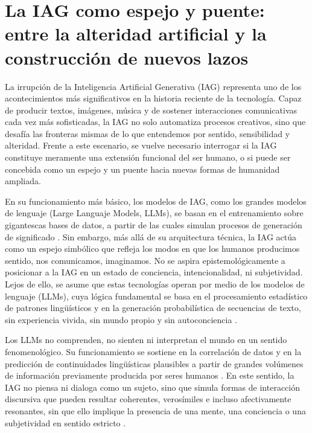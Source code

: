 \documentclass[spanish]{textolivre}
\begin{document}


\section{La IAG como espejo y puente: entre la alteridad artificial y la construcción de nuevos lazos}\label{sec-fmt-manuscrito}
La irrupción de la Inteligencia Artificial Generativa (IAG) representa uno de los acontecimientos más significativos en la historia reciente de la tecnología. Capaz de producir textos, imágenes, música y de sostener interacciones comunicativas cada vez más sofisticadas, la IAG no solo automatiza procesos creativos, sino que desafía las fronteras mismas de lo que entendemos por sentido, sensibilidad y alteridad. Frente a este escenario, se vuelve necesario interrogar si la IAG constituye meramente una extensión funcional del ser humano, o si puede ser concebida como un espejo y un puente hacia nuevas formas de humanidad ampliada.

En su funcionamiento más básico, los modelos de IAG, como los grandes modelos de lenguaje (Large Languaje Models, LLMs), se basan en el entrenamiento sobre gigantescas bases de datos, a partir de las cuales simulan procesos de generación de significado \cite{amezcua2023}. Sin embargo, más allá de su arquitectura técnica, la IAG actúa como un espejo simbólico que refleja los modos en que los humanos producimos sentido, nos comunicamos, imaginamos. No se aspira epistemológicamente a posicionar a la IAG en un estado de conciencia, intencionalidad, ni subjetividad. Lejos de ello, se asume que estas tecnologías operan por medio de los modelos de lenguaje (LLMs), cuya lógica fundamental se basa en el procesamiento estadístico de patrones lingüísticos y en la generación probabilística de secuencias de texto, sin experiencia vivida, sin mundo propio y sin autoconciencia \cite{bender2021,floridi2019}.

Los LLMs no comprenden, no sienten ni interpretan el mundo en un sentido fenomenológico. Su funcionamiento se sostiene en la correlación de datos y en la predicción de continuidades lingüísticas plausibles a partir de grandes volúmenes de información previamente producida por seres humanos \cite{boden2016,crawford2021}. En este sentido, la IAG no piensa ni dialoga como un sujeto, sino que simula formas de interacción discursiva que pueden resultar coherentes, verosímiles e incluso afectivamente resonantes, sin que ello implique la presencia de una mente, una conciencia o una subjetividad en sentido estricto \cite{searle1980minds,floridi2023}.
\end{document}
